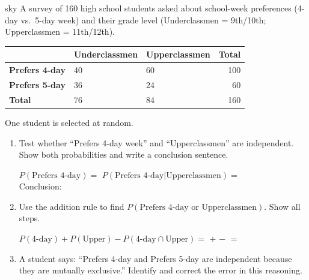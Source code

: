 \documentclass[10pt]{article}
\begin{document}
\namedateperiod

\vspace{0.14in}

\begin{scenariobox}[Context]{sky}
\small
A survey of 160 high school students asked about school-week preferences (4-day vs.\
5-day week) and their grade level (Underclassmen = 9th/10th; Upperclassmen = 11th/12th).

\vspace{6pt}
\renewcommand{\arraystretch}{1.4}
\begin{tabularx}{\linewidth}{@{} l X X r @{}}
 & \textbf{Underclassmen} & \textbf{Upperclassmen} & \textbf{Total} \\
\hline
\textbf{Prefers 4-day}  & 40 & 60 & 100 \\
\textbf{Prefers 5-day}  & 36 & 24 & 60  \\
\hline
\textbf{Total}          & 76 & 84 & 160 \\
\end{tabularx}

\vspace{4pt}
One student is selected at random.
\end{scenariobox}

\vspace{0.1in}

\begin{practicebox}
\small
\begin{enumerate}[leftmargin=1.5em, itemsep=14pt]
  \item Test whether ``Prefers 4-day week'' and ``Upperclassmen'' are independent.
        Show both probabilities and write a conclusion sentence.

        \vspace{4pt}
        $P(\text{Prefers 4-day}) = $ \blank{3cm} \quad
        $P(\text{Prefers 4-day} | \text{Upperclassmen}) = $ \blank{3cm}\\[4pt]
        Conclusion: \writeline\writeline

  \item Use the addition rule to find $P(\text{Prefers 4-day or Upperclassmen})$.
        Show all steps.

        \vspace{4pt}
        $P(\text{4-day}) + P(\text{Upper}) - P(\text{4-day} \cap \text{Upper}) = $
        \blank{2cm} $+$ \blank{2cm} $-$ \blank{2cm} $=$ \blank{3cm}

  \item A student says: ``Prefers 4-day and Prefers 5-day are independent because
        they are mutually exclusive.'' Identify and correct the error in this reasoning.\\
        \writeline\\[1pt]\writeline\\[1pt]\writeline
\end{enumerate}
\end{practicebox}
\end{document}

